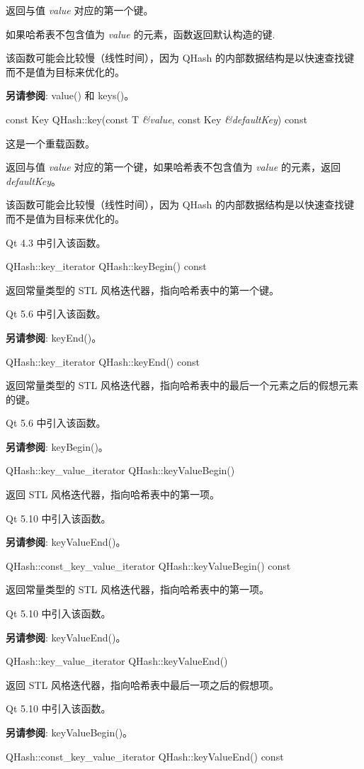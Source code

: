 返回与值 \emph{value} 对应的第一个键。

如果哈希表不包含值为 \emph{value} 的元素，函数返回默认构造的键.

该函数可能会比较慢（线性时间），因为 QHash 的内部数据结构是以快速查找键而不是值为目标来优化的。

\textbf{另请参阅}: value() 和 keys()。

const Key QHash::key(const T \emph{\&value}, const Key \emph{\&defaultKey}) const

这是一个重载函数。

返回与值 \emph{value} 对应的第一个键，如果哈希表不包含值为 \emph{value} 的元素，返回 \emph{defaultKey}。

该函数可能会比较慢（线性时间），因为 QHash 的内部数据结构是以快速查找键而不是值为目标来优化的。

Qt 4.3 中引入该函数。

QHash::key\_iterator QHash::keyBegin() const

返回常量类型的 STL 风格迭代器，指向哈希表中的第一个键。

Qt 5.6 中引入该函数。

\textbf{另请参阅}: keyEnd()。

QHash::key\_iterator QHash::keyEnd() const

返回常量类型的 STL 风格迭代器，指向哈希表中的最后一个元素之后的假想元素的键。

Qt 5.6 中引入该函数。

\textbf{另请参阅}: keyBegin()。

QHash::key\_value\_iterator QHash::keyValueBegin()

返回 STL 风格迭代器，指向哈希表中的第一项。

Qt 5.10 中引入该函数。

\textbf{另请参阅}: keyValueEnd()。

QHash::const\_key\_value\_iterator QHash::keyValueBegin() const

返回常量类型的 STL 风格迭代器，指向哈希表中的第一项。

Qt 5.10 中引入该函数。

\textbf{另请参阅}: keyValueEnd()。

QHash::key\_value\_iterator QHash::keyValueEnd()

返回 STL 风格迭代器，指向哈希表中最后一项之后的假想项。

Qt 5.10 中引入该函数。

\textbf{另请参阅}: keyValueBegin()。

QHash::const\_key\_value\_iterator QHash::keyValueEnd() const

